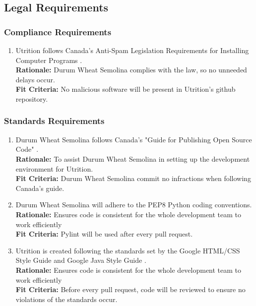 \documentclass[12pt]{article}
\begin{document}
{\subsection{Legal Requirements}
\subsubsection{Compliance Requirements}
\begin{enumerate}[{LR}1. ]
	\item Utrition follows Canada’s Anti-Spam Legislation Requirements for Installing Computer Programs \citep{CanadianInstall}.\\
	\textbf{Rationale:} Durum Wheat Semolina complies with the law, so no unneeded delays occur.\\
	\textbf{Fit Criteria:} No malicious software will be present in Utrition’s github repository.
\end{enumerate}
\subsubsection{Standards Requirements}
\begin{enumerate}[start=2,label={LR\arabic*.}]
	\item Durum Wheat Semolina follows Canada's "Guide for Publishing Open Source 
	Code" \citep{CanadianCode}.\\
	\textbf{Rationale:} To assist Durum Wheat Semolina in setting up the development environment for Utrition.\\
	\textbf{Fit Criteria:} Durum Wheat Semolina commit no infractions when following Canada’s guide.
	\item Durum Wheat Semolina will adhere to the PEP8 Python coding conventions.\\
	\textbf{Rationale:} Ensures code is consistent for the whole development team to work efficiently \\
	\textbf{Fit Criteria:} Pylint will be used after every pull request.
	\item Utrition is created following the standards set by the Google HTML/CSS Style Guide \citep{HTMLCSSStyle} and Google Java Style Guide \citep{JavaStyle}. \\
	\textbf{Rationale:} Ensures code is consistent for the whole development team to work efficiently \\
	\textbf{Fit Criteria:} Before every pull request, code will be reviewed to ensure no violations of the standards occur.
\end{enumerate}

}
\end{document}
